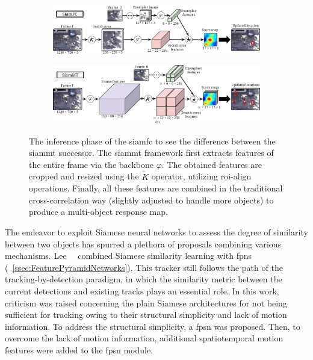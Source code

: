 \begin{figure}[!t]
    \centering
    \begin{subfigure}[b]{\textwidth}
        \centering
        \includegraphics[width=\textwidth]{figures/theoretical_foundations/siammt_orig.png}
        \caption[]{}
    \end{subfigure}
    \begin{subfigure}[b]{\textwidth}
        \centering
        \includegraphics[width=\textwidth]{figures/theoretical_foundations/siammt_new.png}
        \caption[]{}
    \end{subfigure}
    \caption[\gls{siammt} architecture]{The inference phase of the  \gls{siamfc} to see the difference between the  \gls{siammt} successor. The \gls{siammt} framework first extracts features of the entire frame via the backbone $\varphi$. The obtained features are cropped and resized using the $\tilde{K}$ operator, utilizing \gls{roi}-align operations. Finally, all these features are combined in the traditional cross-correlation way (slightly adjusted to handle more objects) to produce a multi-object response map. }
    \label{fig:SiamMTArchitecture}
\end{figure}

The endeavor to exploit Siamese neural networks to assess the degree of similarity between two objects has spurred a plethora of proposals combining various mechanisms. Lee~\etal{}~\cite{lee2019motfpsn} combined Siamese similarity learning with \glspl{fpn} (\sectiontext{}~\ref{ssec:FeaturePyramidNetworks}). This tracker still follows the path of the tracking-by-detection paradigm, in which the similarity metric between the current detections and existing tracks plays an essential role. In this work, criticism was raised concerning the plain Siamese architectures for not being sufficient for tracking owing to their structural simplicity and lack of motion information. To address the structural simplicity, a \gls{fpsn} was proposed. Then, to overcome the lack of motion information, additional spatiotemporal motion features were added to the \gls{fpsn} module.

